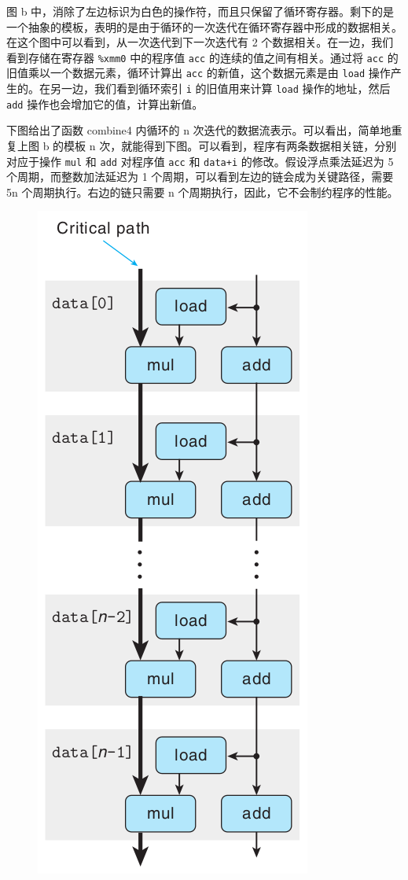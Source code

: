 图 b 中，消除了左边标识为白色的操作符，而且只保留了循环寄存器。剩下的是一个抽象的模板，表明的是由于循环的一次迭代在循环寄存器中形成的数据相关。在这个图中可以看到，从一次迭代到下一次迭代有 2 个数据相关。在一边，我们看到存储在寄存器 \verb|%xmm0| 中的程序值 \verb|acc| 的连续的值之间有相关。通过将 \verb|acc| 的旧值乘以一个数据元素，循环计算出 \verb|acc| 的新值，这个数据元素是由 \verb|load| 操作产生的。在另一边，我们看到循环索引 \verb|i| 的旧值用来计算 \verb|load| 操作的地址，然后 \verb|add| 操作也会增加它的值，计算出新值。

下图给出了函数 combine4 内循环的 n 次迭代的数据流表示。可以看出，简单地重复上图 b 的模板 n 次，就能得到下图。可以看到，程序有两条数据相关链，分别对应于操作 \verb|mul| 和 \verb|add| 对程序值 \verb|acc| 和 \verb|data+i| 的修改。假设浮点乘法延迟为 5 个周期，而整数加法延迟为 1 个周期，可以看到左边的链会成为关键路径，需要 5n 个周期执行。右边的链只需要 n 个周期执行，因此，它不会制约程序的性能。

\begin{figure}[!ht]
    \centering
    \includegraphics[scale=0.5]{img/5-4}
\end{figure}

